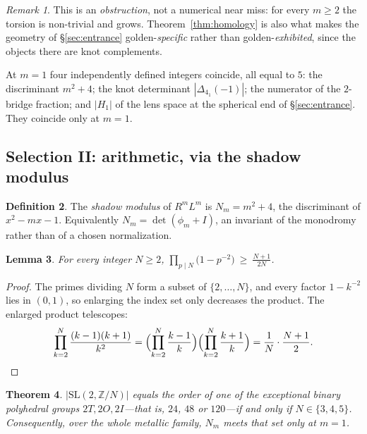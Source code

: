 \documentclass[11pt,reqno]{amsart}
\theoremstyle{plain}
\newtheorem{theorem}{Theorem}[section]
\newtheorem{lemma}[theorem]{Lemma}
\theoremstyle{definition}
\newtheorem{definition}[theorem]{Definition}
\theoremstyle{remark}
\newtheorem{remark}[theorem]{Remark}
\newcommand{\Z}{\mathbb{Z}}
\newcommand{\SL}{\mathrm{SL}}
\begin{document}
\begin{remark}
This is an \emph{obstruction}, not a numerical near miss: for every $m\ge2$ the torsion
is non-trivial and grows. Theorem~\ref{thm:homology} is also what makes the geometry of
\S\ref{sec:entrance} golden-\emph{specific} rather than golden-\emph{exhibited}, since
the objects there are knot complements.
\end{remark}

At $m=1$ four independently defined integers coincide, all equal to $5$: the
discriminant $m^2+4$; the knot determinant $|\Delta_{4_1}(-1)|$; the numerator of the
$2$-bridge fraction; and $|H_1|$ of the lens space at the spherical end of
\S\ref{sec:entrance}. They coincide only at $m=1$.

\subsection{Selection II: arithmetic, via the shadow modulus}\label{sec:shadow}

\begin{definition}
The \emph{shadow modulus} of $R^mL^m$ is $N_m=m^2+4$, the discriminant of $x^2-mx-1$.
Equivalently $N_m=\det(\phi_m+I)$, an invariant of the monodromy rather than of a chosen
normalization.
\end{definition}

\begin{lemma}\label{lem:telescope}
For every integer $N\ge2$, $\displaystyle\prod_{p\mid N}\bigl(1-p^{-2}\bigr)\ \ge\
\frac{N+1}{2N}$.
\end{lemma}

\begin{proof}
The primes dividing $N$ form a subset of $\{2,\dots,N\}$, and every factor $1-k^{-2}$
lies in $(0,1)$, so enlarging the index set only decreases the product. The enlarged
product telescopes:
\[
   \prod_{k=2}^{N}\frac{(k-1)(k+1)}{k^{2}}
   =\Bigl(\prod_{k=2}^{N}\frac{k-1}{k}\Bigr)\Bigl(\prod_{k=2}^{N}\frac{k+1}{k}\Bigr)
   =\frac{1}{N}\cdot\frac{N+1}{2}. \qedhere
\]
\end{proof}

\begin{theorem}\label{thm:shadow}
$|\SL(2,\Z/N)|$ equals the order of one of the exceptional binary polyhedral groups
$2T,2O,2I$---that is, $24$, $48$ or $120$---if and only if $N\in\{3,4,5\}$. Consequently,
over the whole metallic family, $N_m$ meets that set only at \textbf{$m=1$}.
\end{theorem}
\end{document}
